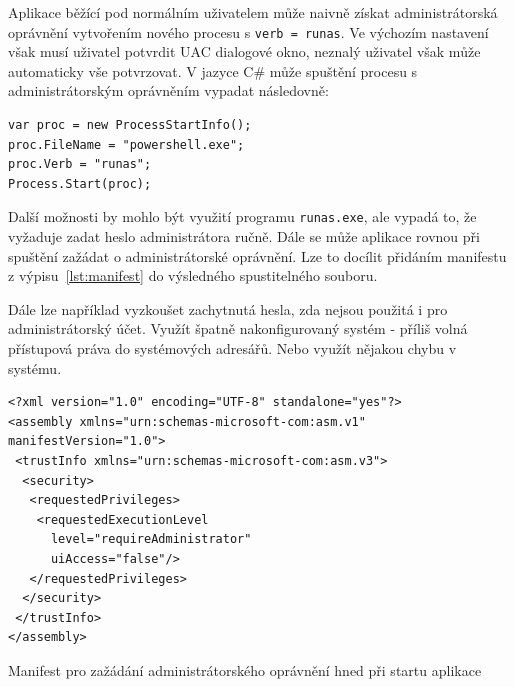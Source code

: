 \documentclass[12pt,a4paper]{article}
\newcommand{\Csh}{C\#}
\begin{document}
Aplikace běžící pod normálním uživatelem může naivně získat administrátorská oprávnění vytvořením nového procesu s \texttt{verb = runas}.
Ve výchozím nastavení však musí uživatel potvrdit UAC dialogové okno, neznalý uživatel však může automaticky vše potvrzovat.
V jazyce \Csh{} může spuštění procesu s administrátorským oprávněním vypadat následovně: 

\begin{verbatim}
var proc = new ProcessStartInfo();
proc.FileName = "powershell.exe";
proc.Verb = "runas";
Process.Start(proc);
\end{verbatim}

Další možnosti by mohlo být využití programu \texttt{runas.exe}, ale vypadá to, že vyžaduje zadat heslo administrátora ručně.
Dále se může aplikace rovnou při spuštění zažádat o administrátorské oprávnění.
Lze to docílit přidáním manifestu z výpisu~\ref{lst:manifest}  do výsledného spustitelného souboru.

Dále lze například vyzkoušet zachytnutá hesla, zda nejsou použitá i pro administrátorský účet.
Využít špatně nakonfigurovaný systém - příliš volná přístupová práva do systémových adresářů.
Nebo využít nějakou chybu v systému.


\begin{listing}
\begin{verbatim}
<?xml version="1.0" encoding="UTF-8" standalone="yes"?>
<assembly xmlns="urn:schemas-microsoft-com:asm.v1" manifestVersion="1.0">
 <trustInfo xmlns="urn:schemas-microsoft-com:asm.v3">
  <security>
   <requestedPrivileges>
	<requestedExecutionLevel 
	  level="requireAdministrator"
	  uiAccess="false"/>
   </requestedPrivileges>
  </security>
 </trustInfo>
</assembly>
\end{verbatim}
\caption{Manifest pro zažádání administrátorského oprávnění hned při startu aplikace}
\label{lst:manifest}
\end{listing}
\end{document}
